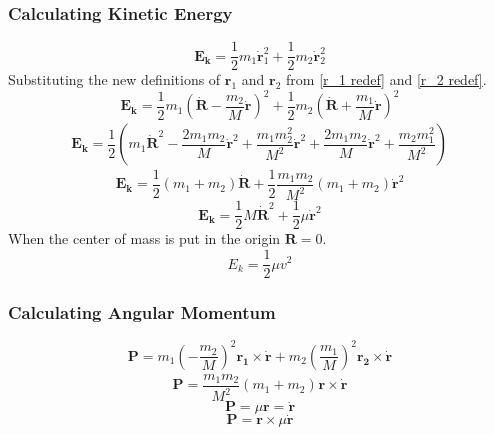 \documentclass[reprint,english,notitlepage]{revtex4-2}
\begin{document}
		\subsubsection{Calculating Kinetic Energy}\label{E_k calc}
			\[
				\mathbf{E_k} = \frac{1}{2}m_1 \mathbf{\dot{r}}_{1}^{2} + \frac{1}{2}m_2 \mathbf{\dot{r}}_{2}^{2}
			\]
			Substituting the new definitions of $ \mathbf{r}_1 $ and $ \mathbf{r}_2 $ from \ref{r_1 redef} and  \ref{r_2 redef}.
			\[
			\mathbf{E_k} = \frac{1}{2} m_1 \left(\mathbf{\dot{R}} - \frac{m_2}{M}\mathbf{\dot{r}}\right)_{}^{2} + \frac{1}{2} m_2 \left(\mathbf{\dot{R}} + \frac{m_1}{M} \mathbf{\dot{r}}\right)_{}^{2}
			\]
			\[
			\mathbf{E_k} = \frac{1}{2} \left(m_1 \mathbf{\dot{R}}^{2} - \frac{2m_1 m_2}{M}\mathbf{\dot{r}}^{2} + \frac{m_1m_2^{2}}{M^{2}}\mathbf{\dot{r}}^{2} + \frac{2m_1m_2}{M}\mathbf{\dot{r}}^{2} + \frac{m_2m_1^{2}}{M^{2}}\right)_{}^{}
			\]
			\[
			\mathbf{E_k} = \frac{1}{2}\left( m_1 + m_2 \right) \mathbf{\dot{R}} + \frac{1}{2} \frac{m_1m_2}{M^{2}} \left( m_1+ m_2  \right) \mathbf{\dot{r}}^{2}
			\]
			\[
			\mathbf{E_k} = \frac{1}{2} M \mathbf{\dot{R}}^{2} + \frac{1}{2} μ \mathbf{\dot{r}}^{2}
			\]
			When the center of mass is put in the origin $ \mathbf{R} = 0 $.
			\[
			E_k = \frac{1}{2} μ v^{2}
			\]


		\subsubsection{Calculating Angular Momentum}\label{AM calc}
			\[
			\mathbf{P} = m_1 \left(- \frac{m_2}{M}\right)_{}^{2}\mathbf{r_1} × \mathbf{\dot{r}} + m_2 \left(\frac{m_1}{M}\right)_{}^{2} \mathbf{r_2} × \mathbf{\dot{r}}
			\]
			\[
			\mathbf{P} = \frac{m_1m_2}{M^{2}} \left(m_1 + m_2\right)_{}^{} \mathbf{r} × \mathbf{\dot{r}} 
			\]
			\[
			\mathbf{P} = μ \mathbf{r} = \mathbf{\dot{r}}
			\]
			\[
			\mathbf{P} = \mathbf{r} × μ \mathbf{\dot{r}}
			\]
\end{document}
